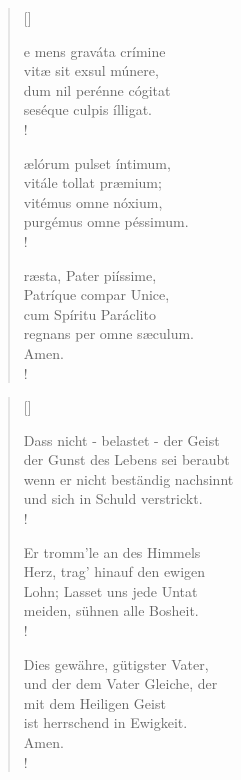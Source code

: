 {\setlength{\columnsep}{1cm}
\begin{multicols}{2} 
\begin{verse}[\versewidth]
 
{\small{
e mens graváta crímine\\
vitæ sit exsul múnere,\\ 
dum nil perénne cógitat\\
seséque culpis ílligat.\\!

ælórum pulset íntimum,\\
vitále tollat præmium;\\
vitémus omne nóxium,\\ 
purgémus omne péssimum.\\!

ræsta, Pater piíssime,\\ 
Patríque compar Unice,\\ 
cum Spíritu Paráclito\\
regnans per omne sæculum.\\
Amen.\\!}}

\end{verse}

\columnbreak

\begin{verse}[\versewidth]
{\small\rm{ Dass nicht - belastet - der Geist \\
der Gunst des Lebens sei beraubt\\
wenn er nicht beständig nachsinnt\\
und sich in Schuld verstrickt.\\!

 Er tromm'le an des Himmels\\
Herz, trag' hinauf den ewigen\\
Lohn; Lasset uns jede Untat\\
meiden, sühnen alle Bosheit.\\!

 Dies gewähre, gütigster Vater,\\
und der dem Vater Gleiche, der \\
mit dem Heiligen Geist \\
ist herrschend in Ewigkeit.\\
Amen.\\!}}
\end{verse}
\end{multicols}
}

